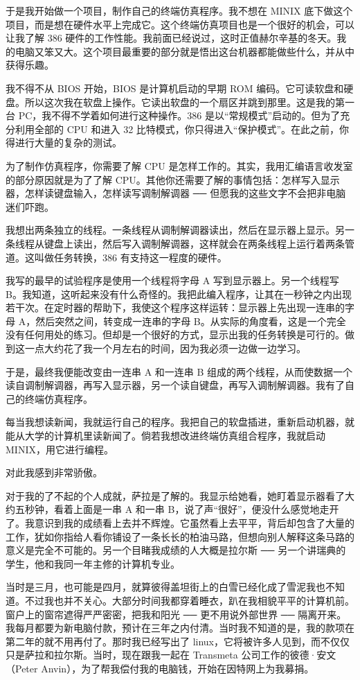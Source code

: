 于是我开始做一个项目，制作自己的终端仿真程序。我不想在 MINIX 底下做这个项目，而是想在硬件水平上完成它。这个终端仿真项目也是一个很好的机会，可以让我了解 386 硬件的工作性能。我前面已经说过，这时正值赫尔辛基的冬天。我的电脑又笨又大。这个项目最重要的部分就是悟出这台机器都能做些什么，并从中获得乐趣。

我不得不从 BIOS 开始，BIOS 是计算机启动的早期 ROM 编码。它可读软盘和硬盘。所以这次我在软盘上操作。它读出软盘的一个扇区并跳到那里。这是我的第一台 PC，我不得不学着如何进行这种操作。386 是以“常规模式”启动的。但为了充分利用全部的 CPU 和进入 32 比特模式，你只得进入“保护模式”。在此之前，你得进行大量的复杂的测试。

为了制作仿真程序，你需要了解 CPU 是怎样工作的。其实，我用汇编语言收发室的部分原因就是为了了解 CPU。其他你还需要了解的事情包括：怎样写入显示器，怎样读键盘输入，怎样读写调制解调器 ── 但愿我的这些文字不会把非电脑迷们吓跑。

我想出两条独立的线程。一条线程从调制解调器读出，然后在显示器上显示。另一条线程从键盘上读出，然后写入调制解调器，这样就会在两条线程上运行着两条管道。这叫做任务转换，386 有支持这一程度的硬件。

我写的最早的试验程序是使用一个线程将字母 A 写到显示器上。另一个线程写 B。我知道，这听起来没有什么奇怪的。我把此编入程序，让其在一秒钟之内出现若干次。在定时器的帮助下，我使这个程序这样运转：显示器上先出现一连串的字母 A，然后突然之间，转变成一连串的字母 B。从实际的角度看，这是一个完全没有任何用处的练习。但却是一个很好的方式，显示出我的任务转换是可行的。做到这一点大约花了我一个月左右的时间，因为我必须一边做一边学习。

于是，最终我便能改变由一连串 A 和一连串 B 组成的两个线程，从而使数据一个读自调制解调器，再写入显示器，另一个读自键盘，再写入调制解调器。我有了自己的终端仿真程序。

每当我想读新闻，我就运行自己的程序。我把自己的软盘插进，重新启动机器，就能从大学的计算机里读新闻了。倘若我想改进终端仿真组合程序，我就启动 MINIX，用它进行编程。

对此我感到非常骄傲。

对于我的了不起的个人成就，萨拉是了解的。我显示给她看，她盯着显示器看了大约五秒钟，看着上面是一串 A 和一串 B，说了声“很好”，便没什么感觉地走开了。我意识到我的成绩看上去并不辉煌。它虽然看上去平平，背后却包含了大量的工作，犹如你指给人看你铺设了一条长长的柏油马路，但想向别人解释这条马路的意义是完全不可能的。另一个目睹我成绩的人大概是拉尔斯 ── 另一个讲瑞典的学生，他和我同一年主修的计算机专业。

当时是三月，也可能是四月，就算彼得盖坦街上的白雪已经化成了雪泥我也不知道。不过我也并不关心。大部分时间我都穿着睡衣，趴在我相貌平平的计算机前。窗户上的窗帘遮得严严密密，把我和阳光 ── 更不用说外部世界 ── 隔离开来。我每月都要为新电脑付款，预计在三年之内付清。当时我不知道的是，我的款项在第二年的就不用再付了。那时我已经写出了 linux，它将被许多人见到，而不仅仅只是萨拉和拉尔斯。当时，现在跟我一起在 Transmeta 公司工作的彼德·安文（Peter Anvin），为了帮我偿付我的电脑钱，开始在因特网上为我募捐。

